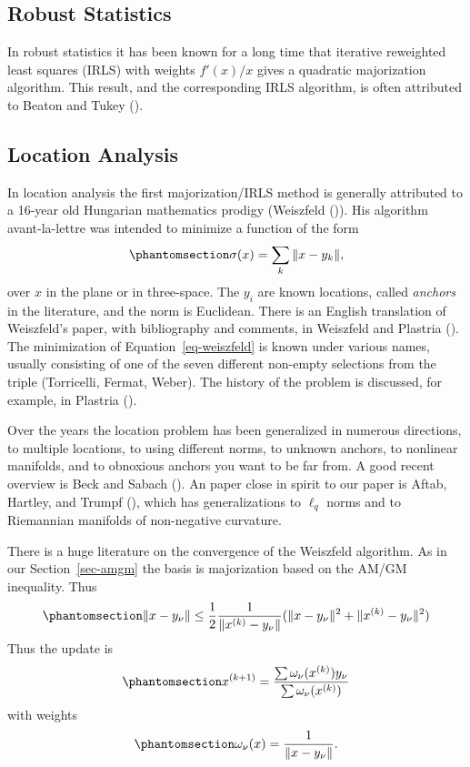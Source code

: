 \documentclass[
  12pt,
  letterpaper,
  DIV=11,
  numbers=noendperiod]{scrartcl}
\theoremstyle{definition}
\theoremstyle{plain}
\theoremstyle{plain}
\theoremstyle{remark}
\begin{document}
\subsection{Robust Statistics}\label{robust-statistics}

In robust statistics it has been known for a long time that iterative
reweighted least squares (IRLS) with weights \(f'(x)/x\) gives a
quadratic majorization algorithm. This result, and the corresponding
IRLS algorithm, is often attributed to Beaton and Tukey
().

\subsection{Location Analysis}\label{location-analysis}

In location analysis the first majorization/IRLS method is generally
attributed to a 16-year old Hungarian mathematics prodigy (Weiszfeld
()). His algorithm avant-la-lettre was
intended to minimize a function of the form
\begin{equation}\phantomsection\label{eq-weiszfeld}{
\sigma(x)=\sum_k \|x-y_k\|,
}\end{equation} over \(x\) in the plane or in three-space. The \(y_i\)
are known locations, called \emph{anchors} in the literature, and the
norm is Euclidean. There is an English translation of Weiszfeld's paper,
with bibliography and comments, in Weiszfeld and Plastria
(). The minimization of
Equation~\ref{eq-weiszfeld} is known under various names, usually
consisting of one of the seven different non-empty selections from the
triple (Torricelli, Fermat, Weber). The history of the problem is
discussed, for example, in Plastria ().

Over the years the location problem has been generalized in numerous
directions, to multiple locations, to using different norms, to unknown
anchors, to nonlinear manifolds, and to obnoxious anchors you want to be
far from. A good recent overview is Beck and Sabach
(). An paper close in spirit to our
paper is Aftab, Hartley, and Trumpf
(), which has
generalizations to \(\ell_q\) norms and to Riemannian manifolds of
non-negative curvature.

There is a huge literature on the convergence of the Weiszfeld
algorithm. As in our Section~\ref{sec-amgm} the basis is majorization
based on the AM/GM inequality. Thus
\begin{equation}\phantomsection\label{eq-wmajw}{
\|x-y_\nu\|\leq\frac12\frac{1}{\|x^{(k)}-y_\nu\|}(\|x-y_\nu\|^2+\|x^{(k)}-y_\nu\|^2)
}\end{equation} Thus the update is
\begin{equation}\phantomsection\label{eq-wupdate}{
x^{(k+1)}=\frac{\sum\omega_\nu(x^{(k)})y_\nu}{\sum\omega_\nu(x^{(k)})}
}\end{equation} with weights
\begin{equation}\phantomsection\label{eq-wweights}{
\omega_\nu(x)=\frac{1}{\|x-y_\nu\|}.
}\end{equation}
\end{document}
